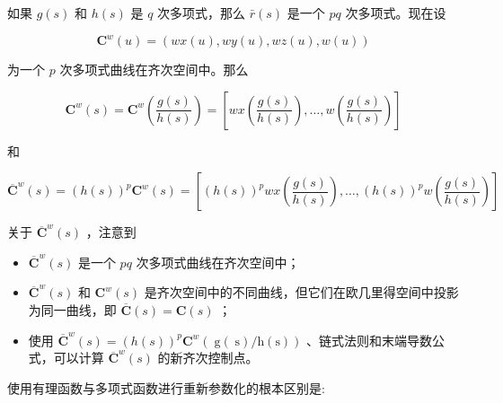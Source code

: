 \documentclass[../main.tex]{subfiles}
\begin{document}
如果 \(g\left( s\right)\) 和 \(h\left( s\right)\) 是 \(q\) 次多项式，那么 \(\bar{r}\left( s\right)\) 是一个 \({pq}\) 次多项式。现在设

\[
{\mathbf{C}}^{w}\left( u\right)  = \left( {{wx}\left( u\right) ,{wy}\left( u\right) ,{wz}\left( u\right) ,w\left( u\right) }\right)
\]

为一个 \(p\) 次多项式曲线在齐次空间中。那么

\[
{\mathbf{C}}^{w}\left( s\right)  = {\mathbf{C}}^{w}\left( \frac{g\left( s\right) }{h\left( s\right) }\right)  = \left\lbrack  {{wx}\left( \frac{g\left( s\right) }{h\left( s\right) }\right) ,\ldots ,w\left( \frac{g\left( s\right) }{h\left( s\right) }\right) }\right\rbrack
\]

和

\[
{\overline{\mathbf{C}}}^{w}\left( s\right)  = {\left( h\left( s\right) \right) }^{p}{\mathbf{C}}^{w}\left( s\right)  = \left\lbrack  {{\left( h\left( s\right) \right) }^{p}{wx}\left( \frac{g\left( s\right) }{h\left( s\right) }\right) ,\ldots ,{\left( h\left( s\right) \right) }^{p}w\left( \frac{g\left( s\right) }{h\left( s\right) }\right) }\right\rbrack
\]

关于 \({\overline{\mathbf{C}}}^{w}\left( s\right)\) ，注意到

\begin{itemize}
\item \({\overline{\mathbf{C}}}^{w}\left( s\right)\) 是一个 \({pq}\) 次多项式曲线在齐次空间中；
\end{itemize}

\begin{itemize}
\item \({\overline{\mathbf{C}}}^{w}\left( s\right)\) 和 \({\mathbf{C}}^{w}\left( s\right)\) 是齐次空间中的不同曲线，但它们在欧几里得空间中投影为同一曲线，即 \(\overline{\mathbf{C}}\left( s\right)  = \mathbf{C}\left( s\right)\) ；
\end{itemize}

\begin{itemize}
\item 使用 \({\overline{\mathbf{C}}}^{w}\left( s\right)  = {\left( h\left( s\right) \right) }^{p}{\mathbf{C}}^{w}\left( {\mathrm{\;g}\left( \mathrm{\;s}\right) /\mathrm{h}\left( \mathrm{s}\right) }\right)\) 、链式法则和末端导数公式，可以计算 \({\overline{\mathbf{C}}}^{w}\left( s\right)\) 的新齐次控制点。
\end{itemize}

使用有理函数与多项式函数进行重新参数化的根本区别是:
\end{document}
